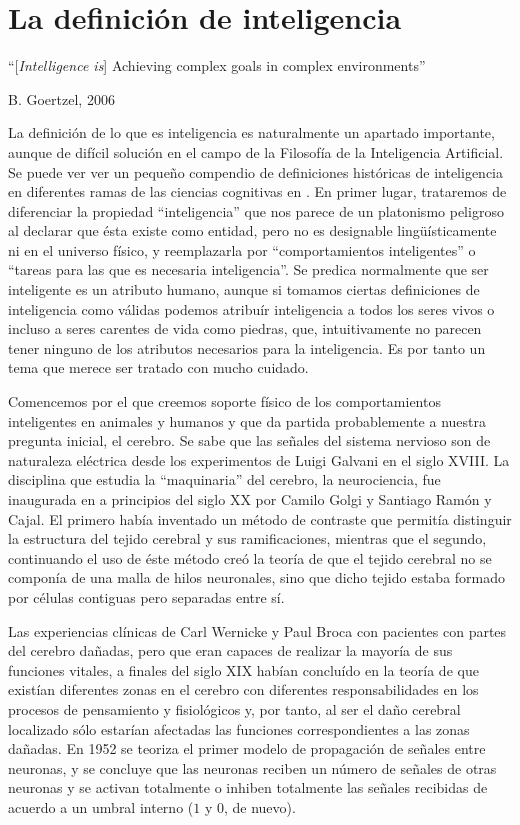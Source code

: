 \documentclass[12pt]{memoir}
\begin{document}
\chapter{La definición de inteligencia}

\epigraph{``[\textit{Intelligence is}] Achieving complex goals in complex environments''}{B. Goertzel, 2006}

La definición de lo que es inteligencia es naturalmente un apartado importante, aunque de difícil solución en el campo de la Filosofía de la Inteligencia Artificial. Se puede ver ver un pequeño compendio de definiciones históricas de inteligencia en diferentes ramas de las ciencias cognitivas en \cite{intDefs}. En primer lugar, trataremos de diferenciar la propiedad ``inteligencia'' que nos parece de un platonismo peligroso al declarar que ésta existe como entidad, pero no es designable lingüísticamente ni en el universo físico, y reemplazarla por ``comportamientos inteligentes'' o ``tareas para las que es necesaria inteligencia''. Se predica normalmente que ser inteligente es un atributo humano, aunque si tomamos ciertas definiciones de inteligencia como válidas podemos atribuír inteligencia a todos los seres vivos o incluso a seres carentes de vida como piedras, que, intuitivamente no parecen tener ninguno de los atributos necesarios para la inteligencia. Es por tanto un tema que merece ser tratado con mucho cuidado.

Comencemos por el que creemos soporte físico de los comportamientos inteligentes en animales y humanos y que da partida probablemente a nuestra pregunta inicial, el cerebro. Se sabe que las señales del sistema nervioso son de naturaleza eléctrica desde los experimentos de Luigi Galvani en el siglo XVIII. La disciplina que estudia la ``maquinaria'' del cerebro, la neurociencia, fue inaugurada en a principios del siglo XX por Camilo Golgi y Santiago Ramón y Cajal. El primero había inventado un método de contraste que permitía distinguir la estructura del tejido cerebral y sus ramificaciones, mientras que el segundo, continuando el uso de éste método creó la teoría de que el tejido cerebral no se componía de una malla de hilos neuronales, sino que dicho tejido estaba formado por células contiguas pero separadas entre sí. 

Las experiencias clínicas de Carl Wernicke y Paul Broca con pacientes con partes del cerebro dañadas, pero que eran capaces de realizar la mayoría de sus funciones vitales, a finales del siglo XIX habían concluído en la teoría de que existían diferentes zonas en el cerebro con diferentes responsabilidades en los procesos de pensamiento y fisiológicos y, por tanto, al ser el daño cerebral localizado sólo estarían afectadas las funciones correspondientes a las zonas dañadas. En 1952 se teoriza el primer modelo de propagación de señales entre neuronas, y se concluye que las neuronas reciben un número de señales de otras neuronas y se activan totalmente o inhiben totalmente las señales recibidas de acuerdo a un umbral interno ($1$ y $0$, de nuevo).
\end{document}
